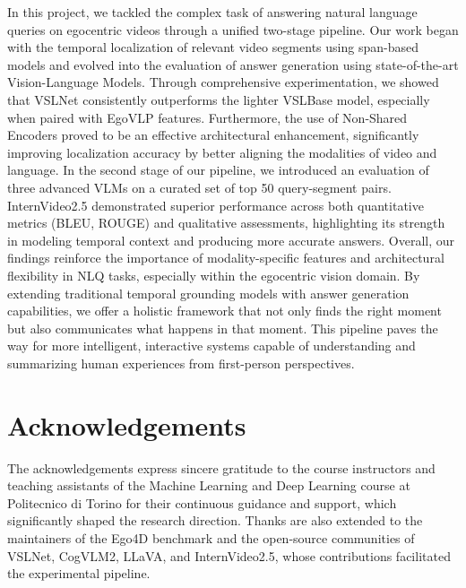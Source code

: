 \documentclass[10pt,twocolumn,letterpaper]{article}
\begin{document}
	
In this project, we tackled the complex task of answering natural language queries on egocentric videos through a unified two-stage pipeline. Our work began with the temporal localization of relevant video segments using span-based models and evolved into the evaluation of answer generation using state-of-the-art Vision-Language Models.
Through comprehensive experimentation, we showed that VSLNet consistently outperforms the lighter VSLBase model, especially when paired with EgoVLP features. Furthermore, the use of Non-Shared Encoders proved to be an effective architectural enhancement, significantly improving localization accuracy by better aligning the modalities of video and language.
In the second stage of our pipeline, we introduced an evaluation of three advanced VLMs on a curated set of top 50 query-segment pairs. InternVideo2.5 demonstrated superior performance across both quantitative metrics (BLEU, ROUGE) and qualitative assessments, highlighting its strength in modeling temporal context and producing more accurate answers.
Overall, our findings reinforce the importance of modality-specific features and architectural flexibility in NLQ tasks, especially within the egocentric vision domain. By extending traditional temporal grounding models with answer generation capabilities, we offer a holistic framework that not only finds the right moment but also communicates what happens in that moment. This pipeline paves the way for more intelligent, interactive systems capable of understanding and summarizing human experiences from first-person perspectives.
	
\section{Acknowledgements}

The acknowledgements express sincere gratitude to the course instructors and teaching assistants of the Machine Learning and Deep Learning course at Politecnico di Torino for their continuous guidance and support, which significantly shaped the research direction. Thanks are also extended to the maintainers of the Ego4D benchmark and the open-source communities of VSLNet, CogVLM2, LLaVA, and InternVideo2.5, whose contributions facilitated the experimental pipeline.
	

	{\small
		
		
	}
	
\end{document}
